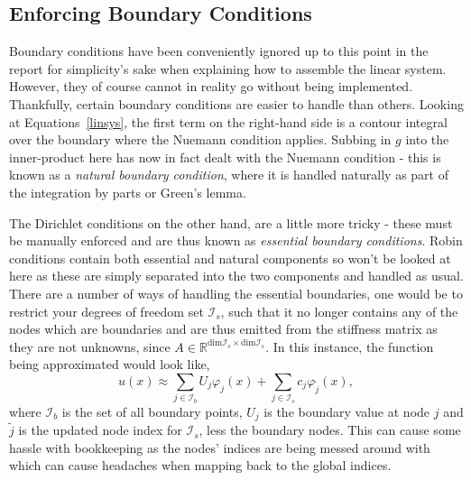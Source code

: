 \subsection{Enforcing Boundary Conditions}

Boundary conditions have been conveniently ignored up to this point in the report for simplicity's sake when explaining how to assemble the linear system. However, they of course cannot in reality go without being implemented. Thankfully, certain boundary conditions are easier to handle than others. Looking at Equations~\eqref{linsys}, the first term on the right-hand side is a contour integral over the boundary where the Nuemann condition applies. Subbing in $g$ into the inner-product here has now in fact dealt with the Nuemann condition - this is known as a \textit{natural boundary condition}, where it is handled naturally as part of the integration by parts or Green's lemma.

The Dirichlet conditions on the other hand, are a little more tricky - these must be manually enforced and are thus known as \textit{essential boundary conditions}. Robin conditions contain both essential and natural components so won't be looked at here as these are simply separated into the two components and handled as usual. There are a number of ways of handling the essential boundaries, one would be to restrict your degrees of freedom set $\mathcal{I}_s$, such that it no longer contains any of the nodes which are boundaries and are thus emitted from the stiffness matrix as they are not unknowns, since $A \in \mathbb{R}^{\text{dim} \mathcal{I}_s \times \text{dim}\mathcal{I}_s}$. In this instance, the function being approximated would look like,
\begin{equation}
	u(x) \approx \sum_{j\in\mathcal{I}_b}U_j\varphi_j(x) + \sum_{j\in\mathcal{I}_s}c_j\varphi_{\widetilde j}(x),
\end{equation}
where $\mathcal{I}_b$ is the set of all boundary points, $U_j$ is the boundary value at node $j$ and $\widetilde{j}$ is the updated node index for $\mathcal{I}_s$, less the boundary nodes. This can cause some hassle with bookkeeping as the nodes' indices are being messed around with which can cause headaches when mapping back to the global indices.

